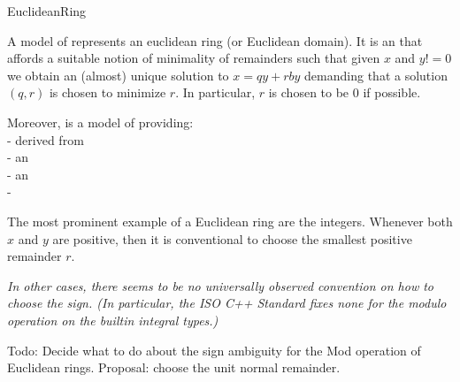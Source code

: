 \begin{ccRefConcept}{EuclideanRing}


\ccDefinition

A model of  represents an euclidean ring (or Euclidean domain). 
It is an  that affords a suitable notion of minimality of remainders 
such that given $x$ and $y != 0$ we obtain an (almost) unique solution to 
$x = qy + r by$ demanding that a solution $(q,r)$ is chosen to minimize $r$. 
In particular, $r$ is chosen to be $0$ if possible.

Moreover,  is a model of 
 providing:\\
 
-  derived from  \\
-  an \\
-  an \\
- \\





The most prominent example of a Euclidean ring are the integers. 
Whenever both $x$ and $y$ are positive, then it is conventional to choose 
the smallest positive remainder $r$. 


{\em \small
In other cases, there seems to be no universally observed convention on how to choose 
the sign. (In particular, the ISO C++ Standard fixes none for the modulo operation 
on the builtin integral types.)

Todo: Decide what to do about the sign ambiguity for the Mod operation of Euclidean rings.
Proposal: choose the unit normal remainder. 
}



\ccRefines

\ccSeeAlso

\\
\\
\\
\\
\\
\\
\\

\ccHasModels


\end{ccRefConcept}